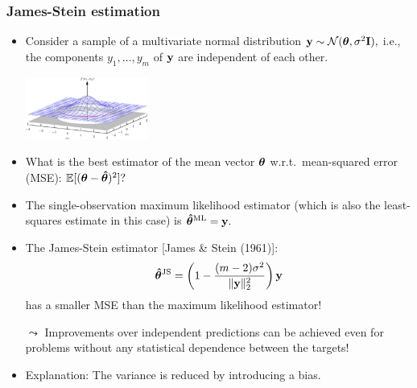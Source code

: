 \documentclass[11pt,compress,t,notes=noshow, xcolor=table]{beamer}
\begin{document}
\begin{frame}
	\frametitle{James-Stein estimation}
%	
	\footnotesize
%	
	\begin{itemize}
%		
		\item Consider a sample of a multivariate normal distribution $\mathbf{y} \sim \mathcal{N}(\bm{\theta}, \sigma^2\mathbf{I}),$ i.e., the components $y_1,\ldots,y_m$ of $\mathbf{y}$ are independent of each other.
%		
		\begin{center}
			\includegraphics[width = 4cm]{figure/biva}
		\end{center}
%		
		\item What is the best estimator of the mean vector $\bm{\theta}$ w.r.t.\ mean-squared error (MSE): $\mathbb{E}[(\bm{\theta} - \bm{\hat\theta})^2]?$  
%		
		\item The single-observation maximum likelihood estimator (which is also the least-squares estimate in this case) is $\bm{\hat\theta}^{\mathrm{ML}} = \mathbf{y}.$  
%		
		\item The James-Stein estimator [James \& Stein (1961)]:
		$$
		\bm{\hat\theta}^{\mathrm{JS}} = \left (1 - \frac{(m-2)\sigma^2}{\|\mathbf{y}\|^2_2} \right )\mathbf{y}
		$$
		has a smaller MSE than the maximum likelihood estimator!
%		
		\item[$\leadsto$] Improvements over independent predictions can be achieved even for problems without any statistical dependence between the targets!
%
		\item Explanation: The variance is reduced by introducing a bias.
%		
%
	\end{itemize}
	
\end{frame}
\end{document}
